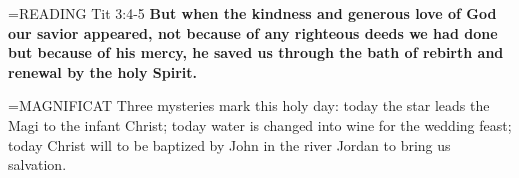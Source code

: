 \hangindent=\parindent \small{\uppercase{READING}}    Tit 3:4-5 \textbf{    But when the kindness and generous love of God our savior appeared, not because of any righteous deeds we had done but because of his mercy, he saved us through the bath of rebirth and renewal by the holy Spirit.\\}

\hangindent=\parindent \small{MAGNIFICAT 	Three mysteries mark this holy day: today the star leads the Magi to the infant Christ; today water is changed into wine for the wedding feast; today Christ will to be baptized by John in the river Jordan to bring us salvation.\\}
